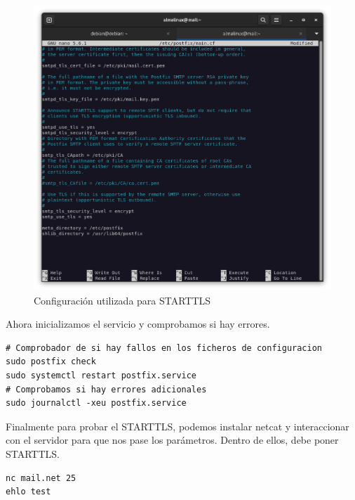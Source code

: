 \begin{figure}[H]
	\centering
	\includegraphics[scale=0.30]{09}
	\caption{Configuración utilizada para STARTTLS}
\end{figure}

Ahora inicializamos el servicio y comprobamos si hay errores.

\begin{lstlisting}[style=mybash]
# Comprobador de si hay fallos en los ficheros de configuracion
sudo postfix check
sudo systemctl restart postfix.service
# Comprobamos si hay errores adicionales
sudo journalctl -xeu postfix.service
\end{lstlisting}


Finalmente para probar el STARTTLS, podemos instalar netcat y interaccionar con el servidor para que nos pase los parámetros. Dentro de ellos, debe poner STARTTLS.

\begin{lstlisting}[style=mybash]
nc mail.net 25
ehlo test
\end{lstlisting}


